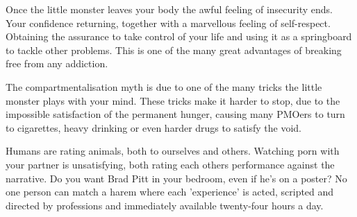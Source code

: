 \documentclass[easypeasy.tex]{subfiles}
\begin{document}
Once the little monster leaves your body the awful feeling of insecurity ends. Your confidence returning, together with a marvellous feeling of self-respect. Obtaining the assurance to take control of your life and using it as a springboard to tackle other problems. This is one of the many great advantages of breaking free from any addiction.

The compartmentalisation myth is due to one of the many tricks the little monster plays with your mind. These tricks make it harder to stop, due to the impossible satisfaction of the permanent hunger, causing many PMOers to turn to cigarettes, heavy drinking or even harder drugs to satisfy the void.

Humans are rating animals, both to ourselves and others. Watching porn with your partner is unsatisfying, both rating each others performance against the narrative. Do you want Brad Pitt in your bedroom, even if he's on a poster? No one person can match a harem where each 'experience' is acted, scripted and directed by professions and immediately available twenty-four hours a day.
\end{document}
